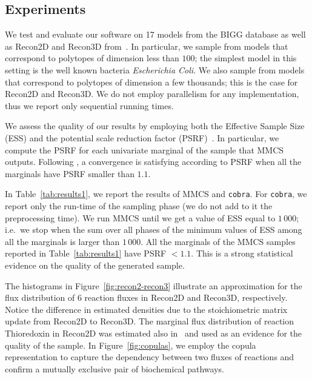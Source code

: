  
 
 \subsection{Experiments}
 \label{subsec:experiments}
 
   We test and evaluate our software on 17 models from the BIGG database
   \cite{king2016bigg} as well as Recon2D and Recon3D from~\cite{Noronha18}. In
   particular, we sample from models that correspond to polytopes of dimension less
   than $100$; the simplest model in this setting is the well known bacteria
   \textit{Escherichia Coli}. We also sample from models that correspond to
   polytopes of dimension a few thousands; this is the case for Recon2D and
   Recon3D. We do not employ parallelism for any implementation, thus we report
   only sequential running times.

   We assess the quality of our results by employing both the Effective Sample Size
   (ESS) and the potential scale reduction factor (PSRF)~\cite{Gelman92}. In
   particular, we compute the PSRF for each univariate marginal of the sample that
   MMCS outputs. Following \cite{Gelman92}, a convergence is satisfying according
   to PSRF when all the marginals have PSRF smaller than $1.1$.



   In Table~\ref{tab:results1}, we report the results of MMCS and \texttt{cobra}. 
   For \texttt{cobra}, we report only the run-time of the sampling phase (we do not add to it the preprocessing time). 
   We run MMCS until we get a value of ESS equal to $1\,000$; i.e.\ we stop
   when the sum over all phases of the minimum values of ESS among all the
   marginals is larger than $1\,000$. 
   All the marginals of the MMCS samples reported in Table~\ref{tab:results1} have PSRF $ < 1.1$. 
   This is a strong statistical evidence on the quality of the generated sample. 

   The histograms in Figure~\ref{fig:recon2-recon3} illustrate an approximation for the flux distribution of 6 reaction fluxes in Recon2D and Recon3D, respectively. 
   Notice the difference in estimated densities due to the stoichiometric matrix update from Recon2D to Recon3D. 
   The marginal flux distribution of reaction Thioredoxin in Recon2D was estimated also in~\cite{haraldsdottir2017chrr} and used as an evidence for the quality of the sample.  
   In Figure~\ref{fig:copulas}, we employ the copula representation to capture the dependency between two fluxes of reactions and confirm a mutually exclusive pair of biochemical pathways. 

